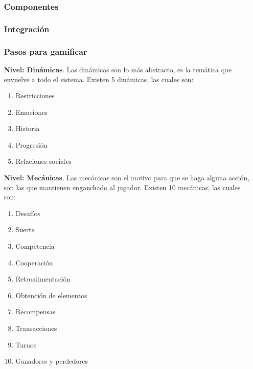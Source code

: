 \subsubsection{Componentes}
\subsubsection{Integración}
\subsubsection{Pasos para gamificar}

    \begin{multicols}{2}
    \noindent
    {\bf Nivel: Dinámicas}.
        Las dinámicas son lo más abstracto, es la temática que envuelve a todo el sistema.
        Existen 5 dinámicas, las cuales son:
        
        \begin{enumerate}
            \item Restricciones
            \item Emociones
            \item Historia
            \item Progresión
            \item Relaciones sociales
        \end{enumerate}

    \vfill\null
    \columnbreak

    \noindent
    {\bf Nivel: Mecánicas}.
        Las mecánicas son el motivo para que se haga alguna acción, son las que mantienen
        enganchado al jugador. Existen 10 mecánicas, las cuales son:
        
        \begin{enumerate}
            \item Desafíos
            \item Suerte 
            \item Competencia
            \item Cooperación
            \item Retroalimentación 
            \item Obtención de elementos
            \item Recompensas
            \item Transacciones
            \item Turnos
            \item Ganadores y perdedores\\
        \end{enumerate}

    \end{multicols}
\clearpage

